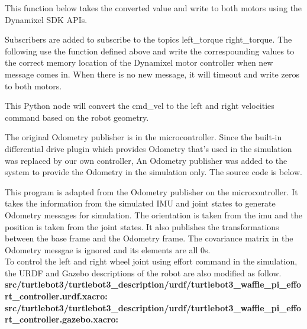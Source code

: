 \documentclass[12]{article}
\begin{document}
This function below takes the converted value and write to both motors using the Dynamixel SDK APIs. 


Subscribers are added to subscribe to the topics \/left\_torque \/right\_torque. 
The following use the function defined above and write the correspounding values to the correct memory location of the Dynamixel motor controller when new message comes in. 
When there is no new message, it will timeout and write zeros to both motors. 

 
This Python node will convert the cmd\_vel to the left and right velocities command based on the robot geometry. 



The original Odometry publisher is in the microcontroller. Since the built-in differential drive plugin which provides 
Odometry that's used in the simulation was replaced by our own controller,
An Odometry publisher was added to the system to provide the Odometry in the simulation only. The source code is below. 



This program is adapted from the Odometry publisher on the microcontroller. It takes the information from the simulated IMU and joint states to generate Odometry messages
for simulation. The orientation is taken from the imu and the position is taken from the joint states. It also publishes the transformations between the
base frame and the Odometry frame. The covariance matrix in the Odometry messgae is ignored and its elements are all 0s. \\

To control the left and right wheel joint using effort command in the simulation, the URDF and Gazebo descriptions of the robot are also modified as follow. \\

\textbf{src/turtlebot3/turtlebot3\_description/urdf/turtlebot3\_waffle\_pi\_effort\_controller.urdf.xacro:} \\


\textbf{src/turtlebot3/turtlebot3\_description/urdf/turtlebot3\_waffle\_pi\_effort\_controller.gazebo.xacro:} \\


\end{document}
